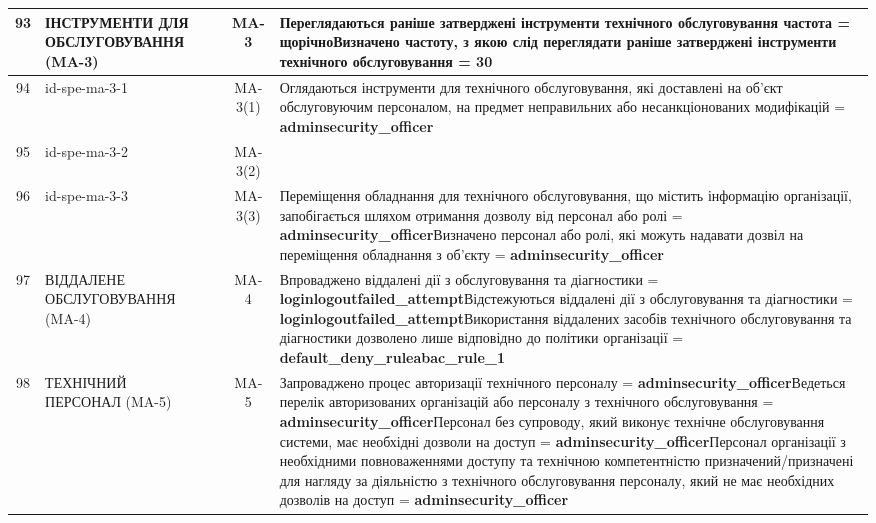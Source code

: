 \documentclass[10pt]{article}
\begin{document}
\begin{longtable}{|c|>{\raggedright\arraybackslash}p{2.5cm}|>{\raggedright\arraybackslash}p{4.5cm}|c|>{\raggedright\arraybackslash}p{4.5cm}|}
93 & ІНСТРУМЕНТИ ДЛЯ ОБСЛУГОВУВАННЯ (MA-3) &  & MA-3 & Переглядаються раніше затверджені інструменти технічного обслуговування частота = \textbf{щорічно}\newline Визначено частоту, з якою слід переглядати раніше затверджені інструменти технічного обслуговування = \textbf{30} \\ \hline
94 & id-spe-ma-3-1 &  & MA-3(1) & Оглядаються інструменти для технічного обслуговування, які доставлені на об'єкт обслуговуючим персоналом, на предмет неправильних або несанкціонованих модифікацій = \textbf{adminsecurity\_\allowbreak{}officer} \\ \hline
95 & id-spe-ma-3-2 &  & MA-3(2) &  \\ \hline
96 & id-spe-ma-3-3 &  & MA-3(3) & Переміщення обладнання для технічного обслуговування, що містить інформацію організації, запобігається шляхом отримання дозволу від персонал або ролі = \textbf{adminsecurity\_\allowbreak{}officer}\newline Визначено персонал або ролі, які можуть надавати дозвіл на переміщення обладнання з об'єкту = \textbf{adminsecurity\_\allowbreak{}officer} \\ \hline
97 & ВІДДАЛЕНЕ ОБСЛУГОВУВАННЯ (MA-4) &  & MA-4 & Впроваджено віддалені дії з обслуговування та діагностики = \textbf{loginlogoutfailed\_\allowbreak{}attempt}\newline Відстежуються віддалені дії з обслуговування та діагностики = \textbf{loginlogoutfailed\_\allowbreak{}attempt}\newline Використання віддалених засобів технічного обслуговування та діагностики дозволено лише відповідно до політики організації = \textbf{default\_\allowbreak{}deny\_\allowbreak{}ruleabac\_\allowbreak{}rule\_\allowbreak{}1} \\ \hline
98 & ТЕХНІЧНИЙ ПЕРСОНАЛ (MA-5) &  & MA-5 & Запроваджено процес авторизації технічного персоналу = \textbf{adminsecurity\_\allowbreak{}officer}\newline Ведеться перелік авторизованих організацій або персоналу з технічного обслуговування = \textbf{adminsecurity\_\allowbreak{}officer}\newline Персонал без супроводу, який виконує технічне обслуговування системи, має необхідні дозволи на доступ = \textbf{adminsecurity\_\allowbreak{}officer}\newline Персонал організації з необхідними повноваженнями доступу та технічною компетентністю призначений/призначені для нагляду за діяльністю з технічного обслуговування персоналу, який не має необхідних дозволів на доступ = \textbf{adminsecurity\_\allowbreak{}officer} \\ \hline

\end{longtable}
\end{document}
